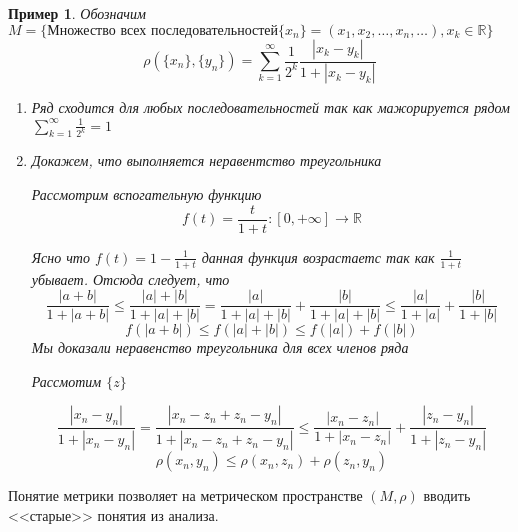 \documentclass[14pt]{extarticle}
\newtheorem{example}{Пример}[definition]
\begin{document}
\begin{example}
	Обозначим $M =  \{\text{Множество всех последовательностей}  \{x_{n}\} = (x_1,x_2,\dots,x_{n},\dots) , x_{k} \in \mathbb{R}\}$
	\begin{equation}
		\rho(\{x_{n}\},\{y_{n}\}) = 
		\sum_{k=1}^{\infty} \frac{1}{2^{k}} \frac{|x_{k} - y_{k}|}{1 + |x_{k} - y_{k}|}
	\end{equation}
	\begin{enumerate}
		\item Ряд сходится для любых последовательностей
			так как мажорируется рядом $\sum_{k=1}^{\infty} \frac{1}{2^{k}} = 1$
		\item Докажем, что выполняется неравентство
			треугольника
			
			Рассмотрим вспогательную функцию
			\begin{equation}
				f(t) = \frac{t}{1  +t} : [0,+\infty] \to \mathbb{R}
			\end{equation}

			Ясно что $f(t) = 1 -\frac{1}{1+t}$ 
			данная функция возрастаетс так как  $\frac{1}{1+t}$ убывает. Отсюда следует, что
			\begin{equation}
				\frac{|a+b|}{1 +|a+b|} 
				\le \frac{|a| + |b|}{1 + |a| + |b|} =
				\frac{|a|}{1+|a|+|b|} + \frac{|b|}{1 +|a| + |b|}\le  \frac{|a|}{1+|a|} +\frac{|b|}{1 + |b|}
			\end{equation}
			\begin{equation}
				f(|a+b|) \le  f(|a| +|b|) \le  f(|a|) + f(|b|)
			\end{equation}
			Мы доказали неравенство треугольника для
			всех членов ряда

			Рассмотим $\{z\}$

			 \begin{equation}
				\frac{|x_{n} - y_{n}|}{1+|x_{n} - y_{n}|} = \frac{|x_{n} - z_{n} + z_{n}  -y_{n}|}{1 + |x_{n} - z_{n} + z_{n} - y_{n}|}\le 
				\frac{|x_{n} - z_{n}|}{1+|x_{n}-z_{n}|} + \frac{|z_{n} - y_{n}|}{1+|z_{n} -y_{n}|}
			\end{equation}
			\begin{equation}
				\rho(x_{n},y_{n}) \le 
				\rho(x_{n},z_{n}) + \rho(z_{n},y_{n})
			\end{equation}
	\end{enumerate}
\end{example}
Понятие метрики позволяет на метрическом пространстве $(M,\rho)$
вводить <<старые>> понятия из анализа.
\end{document}
